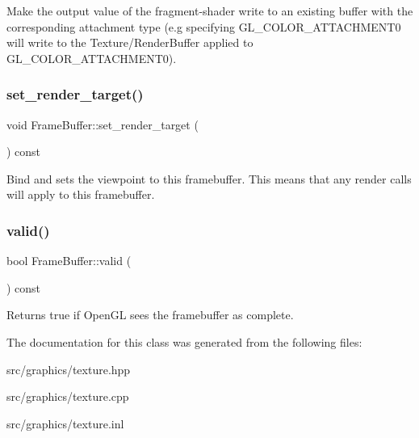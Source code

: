 Make the output value of the fragment-\/shader write to an existing buffer with the corresponding attachment type (e.\+g specifying G\+L\+\_\+\+C\+O\+L\+O\+R\+\_\+\+A\+T\+T\+A\+C\+H\+M\+E\+N\+T0 will write to the Texture/\+Render\+Buffer applied to G\+L\+\_\+\+C\+O\+L\+O\+R\+\_\+\+A\+T\+T\+A\+C\+H\+M\+E\+N\+T0). \mbox{\label{class_frame_buffer_ace702e593b6724f151b1aa8a5441124a}} 
\subsubsection{\texorpdfstring{set\+\_\+render\+\_\+target()}{set\_render\_target()}}
{\footnotesize\ttfamily void Frame\+Buffer\+::set\+\_\+render\+\_\+target (\begin{DoxyParamCaption}{ }\end{DoxyParamCaption}) const}

Bind and sets the viewpoint to this framebuffer. This means that any render calls will apply to this framebuffer. \mbox{\label{class_frame_buffer_a5f86a8082e22b7d7922c8214fd2540a5}} 
\subsubsection{\texorpdfstring{valid()}{valid()}}
{\footnotesize\ttfamily bool Frame\+Buffer\+::valid (\begin{DoxyParamCaption}{ }\end{DoxyParamCaption}) const}

Returns true if Open\+GL sees the framebuffer as complete. 

The documentation for this class was generated from the following files\+:\begin{DoxyCompactItemize}
\item 
src/graphics/texture.\+hpp\item 
src/graphics/texture.\+cpp\item 
src/graphics/texture.\+inl\end{DoxyCompactItemize}
